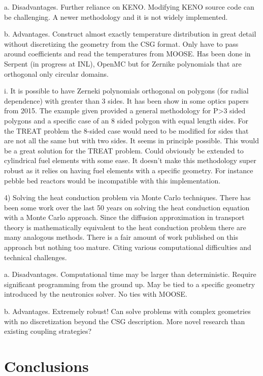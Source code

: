 \documentclass[11pt]{article}
\begin{document}
a.	Disadvantages.  Further reliance on KENO.  Modifying KENO source code can be challenging.  A newer methodology and it is not widely implemented.

b.	Advantages.  Construct almost exactly temperature distribution in great detail without discretizing the geometry from the CSG format.  Only have to pass around coefficients and read the temperatures from MOOSE.  Has been done in Serpent (in progress at INL), OpenMC but for Zernike polynomials that are orthogonal only circular domains.  

i.	It is possible to have Zerneki polynomials orthogonal on polygons (for radial dependence) with greater than 3 sides.  It has been show in some optics papers from 2015.  The example given provided a general methodology for P>3 sided polygons and a specific case of an 8 sided polygon with equal length sides.  For the TREAT problem the 8-sided case would need to be modified for sides that are not all the same but with two sides.  It seems in principle possible.  This would be a great solution for the TREAT problem. Could obviously be extended to cylindrical fuel elements with some ease.  It doesn’t make this methodology super robust as it relies on having fuel elements with a specific geometry.  For instance pebble bed reactors would be incompatible with this implementation. 

4)	Solving the heat conduction problem via Monte Carlo techniques.  There has been some work over the last 50 years on solving the heat conduction equation with a Monte Carlo approach.  Since the diffusion approximation in transport theory is mathematically equivalent to the heat conduction problem there are many analogous methods.  There is a fair amount of work published on this approach but nothing too mature.  Citing various computational difficulties and technical challenges. 

a.	Disadvantages.  Computational time may be larger than deterministic.  Require significant programming from the ground up.  May be tied to a specific geometry introduced by the neutronics solver.  No ties with MOOSE.

b.	Advantages.  Extremely robust!  Can solve problems with complex geometries with no discretization beyond the CSG description.  More novel research than existing coupling strategies?

\section{Conclusions}



\end{document}
